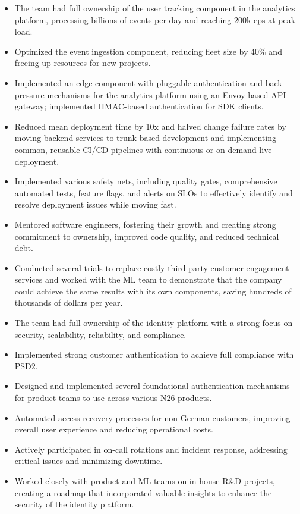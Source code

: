 \documentclass[a4paper,10pt]{article}
\begin{document}
    \begin{itemize}
        \item The team had full ownership of the user tracking component in the analytics platform, processing billions
        of events per day and reaching 200k eps at peak load.
        \item Optimized the event ingestion component, reducing fleet size by 40\% and freeing up resources for new projects.
        \item Implemented an edge component with pluggable authentication and back-pressure mechanisms for the analytics platform
        using an Envoy-based API gateway; implemented HMAC-based authentication for SDK clients.
        \item Reduced mean deployment time by 10x and halved change failure rates
        by moving backend services to trunk-based development and implementing common, reusable CI/CD pipelines with
        continuous or on-demand live deployment.
        \item Implemented various safety nets, including quality gates, comprehensive automated tests,
        feature flags, and alerts on SLOs to effectively identify and resolve deployment issues while moving fast.
        \item Mentored software engineers, fostering their growth and creating strong commitment to ownership,
        improved code quality, and reduced technical debt.
        \item Conducted several trials to replace costly third-party customer engagement services
        and worked with the ML team to demonstrate that the company could achieve the same results with its own components,
        saving hundreds of thousands of dollars per year.
    \end{itemize}

    \begin{itemize}
        \item The team had full ownership of the identity platform with a strong focus on security, scalability, reliability, and compliance.
        \item Implemented strong customer authentication to achieve full compliance with PSD2.
        \item Designed and implemented several foundational authentication mechanisms for product teams to use across various N26 products.
        \item Automated access recovery processes for non-German customers, improving overall user experience and reducing operational costs.
        \item Actively participated in on-call rotations and incident response, addressing critical issues and minimizing downtime.
        \item Worked closely with product and ML teams on in-house R\&D projects, creating a roadmap that
        incorporated valuable insights to enhance the security of the identity platform.
    \end{itemize}
\end{document}
